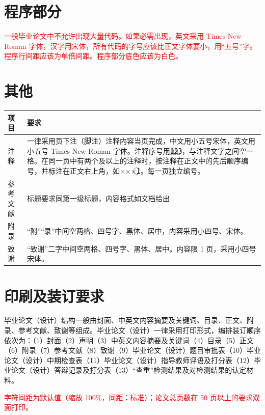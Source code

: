 \section{程序部分}

\textcolor{red}{一般毕业论文中不允许出现大量代码。如果必需出现，英文采用 Times New Roman 字体，汉字用宋体，所有代码的字号应该比正文字体要小，用“五号”字。程序行间距应该为单倍间距。程序部分底色应该为白色。}

\section{其他}

\begin{center}
\renewcommand{\arraystretch}{1.25}
\zihaowu
\begin{tabularx}{0.92\textwidth}{|p{2.4cm}|X|}
\hline
项目 & 要求 \\
\hline
注释 & 一律采用页下注（脚注）注释内容当页完成，中文用小五号宋体，英文用小五号 Times New Roman 字体。注释序号用\textcircled{1}\textcircled{2}\textcircled{3}，与注释文字之间空一格。在同一页中有两个及以上的注释时，按注释在正文中的先后顺序编号，并标注在正文右上角，如×××\textcircled{1}。每一页独立编号。 \\
\hline
参考文献 & 标题要求同第一级标题，内容格式如文档给出 \\
\hline
附录 & “附”“录”中间空两格、四号字、黑体、居中，内容采用小四号、宋体。 \\
\hline
致谢 & “致谢”二字中间空两格、四号字、黑体、居中。内容限 1 页，采用小四号宋体。 \\
\hline
\end{tabularx}
\end{center}

\section{印刷及装订要求}

毕业论文（设计）结构一般由封面、中英文内容摘要及关键词、目录、正文、附录、参考文献、致谢等组成。毕业论文（设计）一律采用打印形式，编排装订顺序依次为：（1）封面（2）声明（3）中英文内容摘要及关键词（4）目录（5）正文（6）附录（7）参考文献（8）致谢（9）毕业论文（设计）题目审批表（10）毕业论文（设计）中期检查表（11）毕业论文（设计）指导教师评语及打分表（12）毕业论文（设计）答辩记录及打分表（13）“查重”检测结果及对检测结果的认定材料。

\textcolor{red}{字符间距为默认值（缩放 100\%，间距：标准）；论文总页数在 50 页以上的要求双面打印。}

